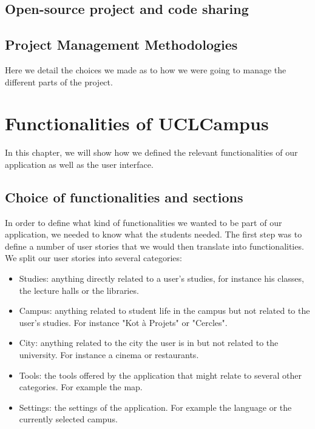 \documentclass[11pt, a4paper]{report}
\begin{document}
\section{Open-source project and code sharing}

\section{Project Management Methodologies}

Here we detail the choices we made as to how we were going to manage the different parts of the project.

\chapter{Functionalities of UCLCampus}

In this chapter, we will show how we defined the relevant functionalities of our application as well as the user interface.

\section{Choice of functionalities and sections}


In order to define what kind of functionalities we wanted to be part of our application, we needed to know what the students needed. The first step was to define a number of user stories that we would then translate into functionalities.\\ 
We split our user stories into several categories:

\begin{itemize}

\item Studies: anything directly related to a user's studies, for instance his classes, the lecture halls or the libraries.
\item Campus: anything related to student life in the campus but not related to the user's studies. For instance "Kot à Projets" or "Cercles".
\item City: anything related to the city the user is in but not related to the university. For instance a cinema or restaurants.
\item Tools: the tools offered by the application that might relate to several other categories. For example the map.
\item Settings: the settings of the application. For example the language or the currently selected campus.

\end{itemize}
\end{document}
